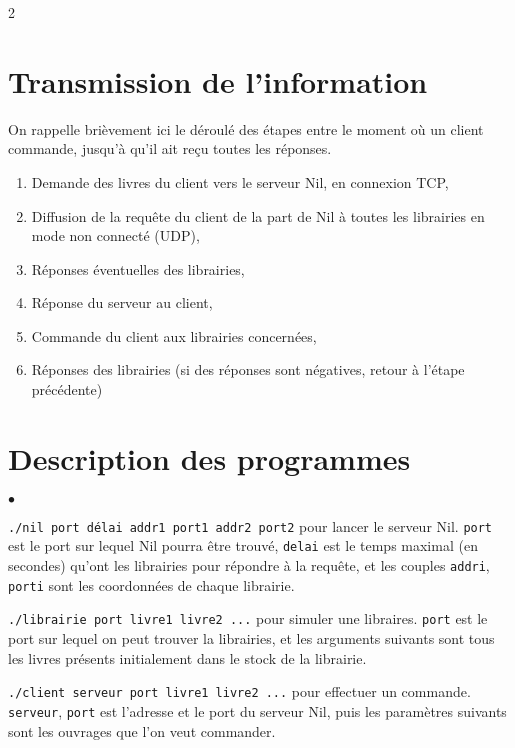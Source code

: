 \documentclass[10pt,a4paper]{article}
\begin{document}
\begin{multicols}{2}

\section{Transmission de l'information}

On rappelle brièvement ici le déroulé des étapes entre le moment où un client commande, jusqu'à qu'il ait reçu toutes les réponses.

\begin{enumerate}
	\item Demande des livres du client vers le serveur Nil, en connexion TCP,
	\item Diffusion de la requête du client de la part de Nil à toutes les librairies en mode non connecté (UDP),
	\item Réponses éventuelles des librairies,
	\item Réponse du serveur au client,
	\item Commande du client aux librairies concernées,
	\item Réponses des librairies (si des réponses sont négatives, retour à l'étape précédente)
\end{enumerate}



\section{Description des programmes}

\begin{list}{$\bullet$}{}
	\item \texttt{./nil port délai addr1 port1 addr2 port2} pour lancer le serveur Nil. \texttt{port} est le port sur lequel Nil pourra être trouvé, \texttt{delai} est le temps maximal (en secondes) qu'ont les librairies pour répondre à la requête, et les couples \texttt{addri}, \texttt{porti} sont les \og coordonnées \fg{} de chaque librairie.
	\item \texttt{./librairie port livre1 livre2 ...} pour simuler une libraires. \texttt{port} est le port sur lequel on peut trouver la librairies, et les arguments suivants sont tous les livres présents initialement dans le stock de la librairie.
	\item \texttt{./client serveur port livre1 livre2 ...} pour effectuer un commande. \texttt{serveur}, \texttt{port} est l'adresse et le port du serveur Nil, puis les paramètres suivants sont les ouvrages que l'on veut commander.
\end{list}



\end{multicols}
\end{document}
